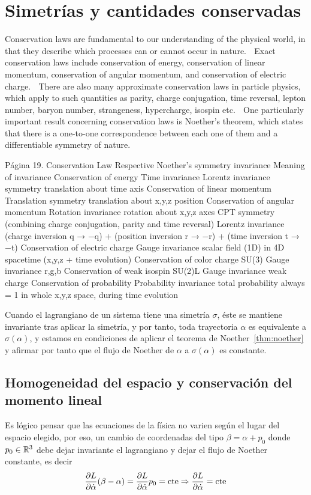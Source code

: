 \chapter{Simetrías y cantidades conservadas}

Conservation laws are fundamental to our understanding of the physical world, in
that they describe which processes can or cannot occur in nature.
 Exact conservation laws include conservation of energy, conservation of linear
momentum, conservation of angular momentum, and conservation of electric
charge.
 There are also many approximate conservation laws in particle physics, which
apply to such quantities as parity, charge conjugation, time reversal, lepton
number, baryon number, strangeness, hypercharge, isospin etc.
 One particularly important result concerning conservation laws is Noether's
theorem, which states that there is a one-to-one correspondence between each
one of them and a differentiable symmetry of nature.

Página 19.
Conservation Law Respective Noether’s
symmetry invariance
Meaning of invariance
Conservation of energy Time invariance
Lorentz invariance
symmetry
translation about time axis
Conservation of linear momentum Translation symmetry translation about x,y,z position
Conservation of angular momentum Rotation invariance rotation about x,y,z axes
CPT symmetry (combining charge
conjugation, parity and time reversal) Lorentz invariance
(charge inversion q → −q) +
(position inversion r → −r)
+ (time inversion t → −t)
Conservation of electric charge Gauge invariance scalar field (1D) in 4D spacetime
(x,y,z + time evolution)
Conservation of color charge SU(3) Gauge invariance r,g,b
Conservation of weak isospin SU(2)L Gauge invariance weak charge
Conservation of probability Probability invariance
total probability always = 1 in
whole x,y,z space,
during time evolution

Cuando el lagrangiano de un sistema tiene una simetría $\sigma$, éste se mantiene invariante tras aplicar la simetría, y por tanto, toda trayectoria $\alpha$ es equivalente a $\sigma(\alpha)$, y estamos en condiciones de aplicar el teorema de Noether~\eqref{thm:noether} y afirmar por tanto que el flujo de Noether de $\alpha$ a $\sigma(\alpha)$ es constante.

\section{Homogeneidad del espacio y conservación del momento lineal}
Es lógico pensar que las ecuaciones de la física no varien según el lugar del espacio elegido, por eso, un cambio de coordenadas del tipo $\beta=\alpha+p_0$ donde $p_0\in\mathbb{R}^3$ debe dejar invariante el lagrangiano y dejar el flujo de Noether constante, es decir
\begin{equation}
	\label{eq:conservacion_momento_lineal}
	\frac{\partial L}{\partial\dot{\alpha}}(\beta-\alpha) = \frac{\partial L}{\partial\dot{\alpha}}p_0=\text{cte}\Rightarrow\frac{\partial L}{\partial\dot{\alpha}}=\text{cte}
\end{equation}

